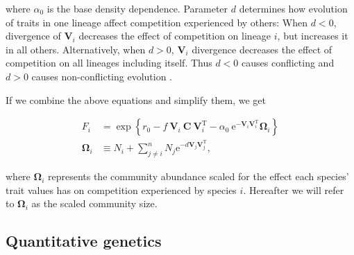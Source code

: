 \noindent where $\alpha_0$ is the base density dependence.
Parameter $d$ determines how evolution of traits in one lineage affect competition 
experienced by others: When $d < 0$, divergence of $\mathbf{V}_i$ decreases the 
effect of competition on lineage $i$, but increases it in all others.
Alternatively, when $d > 0$, $\mathbf{V}_i$ divergence decreases the effect of 
competition on all lineages including itself.
Thus $d < 0$ causes conflicting and $d > 0$ causes non-conflicting evolution
\citep{Northfield:2013if}.


If we combine the above equations and simplify them, we get

\begin{equation} \label{eq:fitness-full}
\begin{split}
    F_{i} &= \exp \left\{ 
        r_0 - f ~ \mathbf{V}_i ~ \mathbf{C} ~ \mathbf{V}_{i}^{\textrm{T}} -    
        \alpha_0 ~\textrm{e}^{- \mathbf{V}_i \mathbf{V}_i^{\textrm{T}} } \mathbf{\Omega}_{i}
        \right\} \\
        \mathbf{\Omega}_i &\equiv N_i +
            \sum_{j \ne i}^{n}{ N_j \textrm{e}^{ -d \mathbf{V}_j \mathbf{V}_j^{\textrm{T}} } }
        \textrm{,}
\end{split}
\end{equation}

\noindent where $\mathbf{\Omega}_i$ represents the community abundance scaled
for the effect each species' trait values has on competition 
experienced by species $i$.
Hereafter we will refer to $\mathbf{\Omega}_i$ as the scaled community size.




%


\subsection*{Quantitative genetics}


